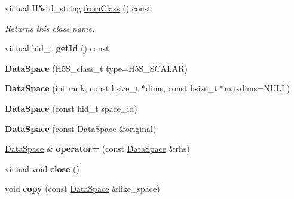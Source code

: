 \begin{DoxyCompactItemize}
virtual H5std\+\_\+string \hyperlink{class_h5_1_1_data_space_a127e32a992f905e055ba1576d18c7d1f}{from\+Class} () const
\begin{DoxyCompactList}\small\item\em Returns this class name. \end{DoxyCompactList}\item 
\mbox{\label{class_h5_1_1_data_space_a119f84e49f0e8fb45dda38fc63395724}} 
virtual hid\+\_\+t {\bfseries get\+Id} () const
\item 
\mbox{\label{class_h5_1_1_data_space_ad56d9dd51af4ece3e7269404903bc4a9}} 
{\bfseries Data\+Space} (H5\+S\+\_\+class\+\_\+t type=H5\+S\+\_\+\+S\+C\+A\+L\+AR)
\item 
\mbox{\label{class_h5_1_1_data_space_a3147799b3cd1e741e591175e61785854}} 
{\bfseries Data\+Space} (int rank, const hsize\+\_\+t $\ast$dims, const hsize\+\_\+t $\ast$maxdims=N\+U\+LL)
\item 
\mbox{\label{class_h5_1_1_data_space_ab62bedbc7e8ced6a2adf71dbc7d143f7}} 
{\bfseries Data\+Space} (const hid\+\_\+t space\+\_\+id)
\item 
\mbox{\label{class_h5_1_1_data_space_a55be5c95c111878a78889697848c14cd}} 
{\bfseries Data\+Space} (const \hyperlink{class_h5_1_1_data_space}{Data\+Space} \&original)
\item 
\mbox{\label{class_h5_1_1_data_space_a5d4903a977821682bf7c97f13946bb94}} 
\hyperlink{class_h5_1_1_data_space}{Data\+Space} \& {\bfseries operator=} (const \hyperlink{class_h5_1_1_data_space}{Data\+Space} \&rhs)
\item 
\mbox{\label{class_h5_1_1_data_space_a505cabc7bc45e0010813bbeb0f565f60}} 
virtual void {\bfseries close} ()
\item 
\mbox{\label{class_h5_1_1_data_space_aec8ac009d4284d786c26e1f7a109e635}} 
void {\bfseries copy} (const \hyperlink{class_h5_1_1_data_space}{Data\+Space} \&like\+\_\+space)
\item 
\mbox{\label{class_h5_1_1_data_space_a6ed40f27cd9b9f3c588a3bbefe1c1ac2}} 

\end{DoxyCompactItemize}
